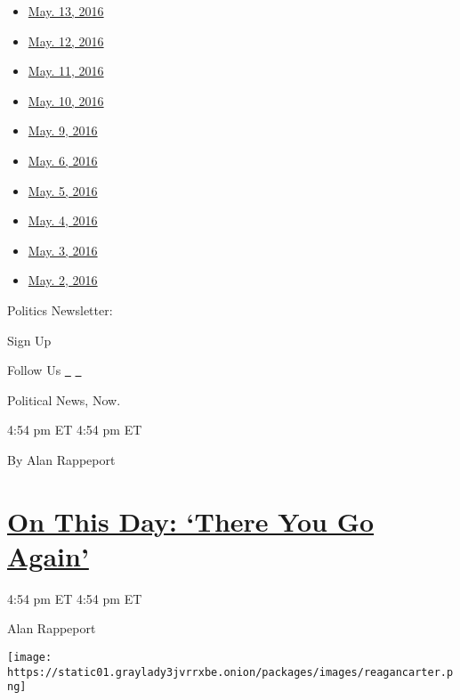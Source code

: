 \begin{itemize}
\tightlist
\item
  \href{//www.nytimes3xbfgragh.onion/politics/first-draft/2016/05/13/}{May.
  13, 2016}
\item
  \href{//www.nytimes3xbfgragh.onion/politics/first-draft/2016/05/12/}{May.
  12, 2016}
\item
  \href{//www.nytimes3xbfgragh.onion/politics/first-draft/2016/05/11/}{May.
  11, 2016}
\item
  \href{//www.nytimes3xbfgragh.onion/politics/first-draft/2016/05/10/}{May.
  10, 2016}
\item
  \href{//www.nytimes3xbfgragh.onion/politics/first-draft/2016/05/09/}{May.
  9, 2016}
\item
  \href{//www.nytimes3xbfgragh.onion/politics/first-draft/2016/05/06/}{May.
  6, 2016}
\item
  \href{//www.nytimes3xbfgragh.onion/politics/first-draft/2016/05/05/}{May.
  5, 2016}
\item
  \href{//www.nytimes3xbfgragh.onion/politics/first-draft/2016/05/04/}{May.
  4, 2016}
\item
  \href{//www.nytimes3xbfgragh.onion/politics/first-draft/2016/05/03/}{May.
  3, 2016}
\item
  \href{//www.nytimes3xbfgragh.onion/politics/first-draft/2016/05/02/}{May.
  2, 2016}
\end{itemize}

Politics Newsletter:

Sign Up

Follow Us \href{https://twitter.com/NYTPolitics}{~}
\href{https://www.facebookcorewwwi.onion/nytpolitics}{~}

Political News, Now.

4:54 pm ET 4:54 pm ET

By Alan Rappeport

\hypertarget{on-this-day-there-you-go-again}{%
\section{\texorpdfstring{\href{//www.nytimes3xbfgragh.onion/politics/first-draft/2014/10/28/on-this-day-there-you-go-again/}{On
This Day: `There You Go
Again'}}{On This Day: `There You Go Again'}}\label{on-this-day-there-you-go-again}}

4:54 pm ET 4:54 pm ET

Alan Rappeport

\texttt{[image: https://static01.graylady3jvrrxbe.onion/packages/images/reagancarter.png]}

